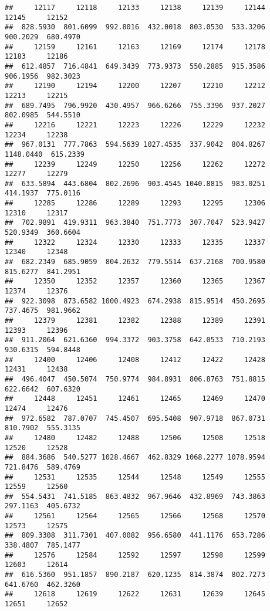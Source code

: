\documentclass[
]{article}
\begin{document}
\begin{verbatim}
##     12117     12118     12133     12138     12139     12144     12145     12152 
##  828.5930  801.6099  992.8016  432.0018  803.0530  533.3206  900.2029  680.4970 
##     12159     12161     12163     12169     12174     12178     12183     12186 
##  612.4857  716.4841  649.3439  773.9373  550.2885  915.3586  906.1956  982.3023 
##     12190     12194     12200     12207     12210     12212     12213     12215 
##  689.7495  796.9920  430.4957  966.6266  755.3396  937.2027  802.0985  544.5510 
##     12216     12221     12223     12226     12229     12232     12234     12238 
##  967.0131  777.7863  594.5639 1027.4535  337.9042  804.8267 1148.0440  615.2339 
##     12239     12249     12250     12256     12262     12272     12277     12279 
##  633.5894  443.6804  802.2696  903.4545 1040.8815  983.0251  414.1937  775.0116 
##     12285     12286     12289     12293     12295     12306     12310     12317 
##  702.9891  419.9311  963.3840  751.7773  307.7047  523.9427  520.9349  360.6604 
##     12322     12324     12330     12333     12335     12337     12340     12348 
##  682.2349  685.9059  804.2632  779.5514  637.2168  700.9580  815.6277  841.2951 
##     12350     12352     12357     12360     12365     12367     12374     12376 
##  922.3098  873.6582 1000.4923  674.2938  815.9514  450.2695  737.4675  981.9662 
##     12379     12381     12382     12388     12389     12391     12393     12396 
##  911.2064  621.6360  994.3372  903.3758  642.0533  710.2193  930.6315  594.8448 
##     12400     12406     12408     12412     12422     12428     12431     12438 
##  496.4047  450.5074  750.9774  984.8931  806.8763  751.8815  622.6642  607.6320 
##     12448     12451     12461     12465     12469     12470     12474     12476 
##  972.6582  787.0707  745.4507  695.5408  907.9718  867.0731  810.7902  555.3135 
##     12480     12482     12488     12506     12508     12518     12520     12528 
##  884.3686  540.5277 1028.4667  462.8329 1068.2277 1078.9594  721.8476  589.4769 
##     12531     12535     12544     12548     12549     12555     12559     12560 
##  554.5431  741.5185  863.4832  967.9646  432.8969  743.3863  297.1163  405.6732 
##     12561     12564     12565     12566     12568     12570     12573     12575 
##  809.3308  311.7301  407.0082  956.6580  441.1176  653.7286  338.4807  785.1477 
##     12576     12584     12592     12597     12598     12599     12603     12614 
##  616.5360  951.1857  890.2187  620.1235  814.3874  802.7273  641.6760  462.3260 
##     12618     12619     12622     12631     12639     12645     12651     12652 

\end{verbatim}
\end{document}
